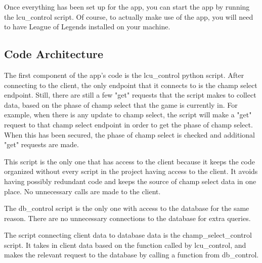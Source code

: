 \documentclass[10pt,twocolumn]{article}
\begin{document}
Once everything has been set up for the app, you can start the app by running the lcu\_control script.
Of course, to actually make use of the app, you will need to have League of Legends installed on your machine.

\subsection{Code Architecture}
The first component of the app's code is the lcu\_control python script.
After connecting to the client, the only endpoint that it connects to is the champ select endpoint.
Still, there are still a few "get" requests that the script makes to collect data, based on the phase of champ select that the game is currently in.
For example, when there is any update to champ select, the script will make a "get" request to that champ select endpoint in order to get the phase of champ select.
When this has been secured, the phase of champ select is checked and additional "get" requests are made.

This script is the only one that has access to the client because it keeps the code organized without every script in the project having access to the client.
It avoids having possibly redundant code and keeps the source of champ select data in one place.
No unnecessary calls are made to the client.

The db\_control script is the only one with access to the database for the same reason.
There are no unnecessary connections to the database for extra queries.

The script connecting client data to database data is the champ\_select\_control script.
It takes in client data based on the function called by lcu\_control, and makes the relevant request to the database by calling a function from db\_control.


\printbibliography
\end{document}
